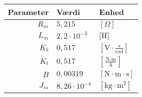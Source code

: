 \begin{tabular}{r|l|l}
Parameter&Værdi&Enhed\\\hline
\(R_m\)&\(5,215\)&\([\Omega]\)\\
\(L_m\)&\(2,2\cdot{}10^{-3}\)&\(\text{[H]}\)\\
\(K_b\)&\(0,517\)&\(\left[ \text{V}\cdot\frac{\text{s}}{\text{rad} }\right] \)\\
\(K_t\)&\(0,517\)&\(\left[ \frac{\text{N}\cdot \text{m}}{\text{A}} \right] \)\\
\(B\)&\(0,00319\)&\(\left[  \text{N} \cdot \text{m} \cdot \text{s}\right] \)\\
\(J_m\)&\(8,26\cdot10^{-4}\)&\(\left[ \text{kg}\cdot{\text{m}^2} \right]  \)\\
\end{tabular}